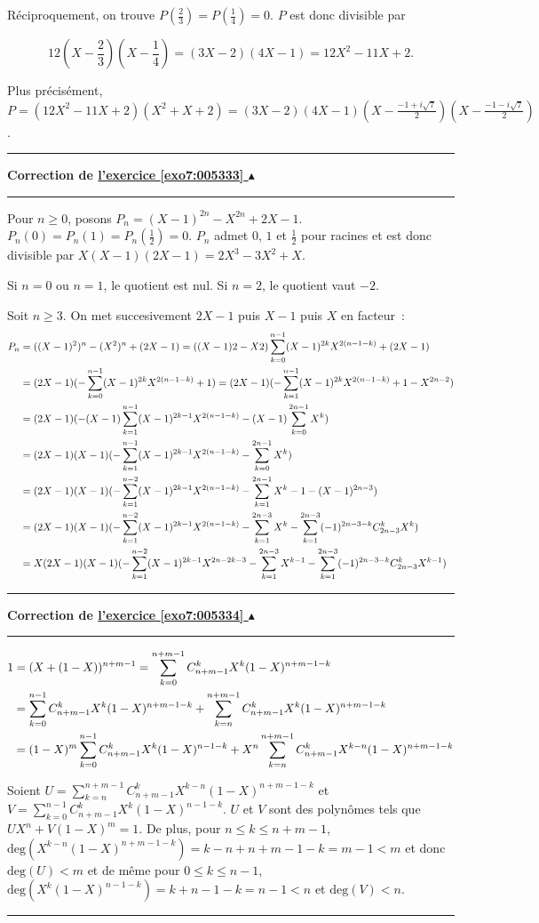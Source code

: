\documentclass[11pt,a4paper]{article}
\newcounter{exo}
\newcommand{\correction}[1]{\hypertarget{cor7:#1}{}\label{cor7:#1}{\bf Correction de \hyperlink{exo7:#1}{l'exercice \ref{exo7:#1} $\blacktriangle$}}\vspace{1mm}\hrule\vspace{1mm}}
\newcommand{\fincorrection}{\vspace{1mm}\hrule\vspace*{7mm}}
\begin{document}
Réciproquement, on trouve $P(\frac{2}{3})=P(\frac{1}{4})=0$. $P$ est donc divisible par

$$12(X-\frac{2}{3})(X-\frac{1}{4})=(3X-2)(4X-1)=12X^2-11X+2.$$

Plus précisément, $P=(12X^2-11X+2)(X^2+X+2)=(3X-2)(4X-1)(X-\frac{-1+i\sqrt{7}}{2})(X-\frac{-1-i\sqrt{7}}{2})$.
\fincorrection
\correction{005333}
Pour $n\geq0$, posons $P_n=(X-1)^{2n}-X^{2n}+2X-1$. $P_n(0)=P_n(1)=P_n(\frac{1}{2})=0$. $P_n$ admet $0$, $1$ et $\frac{1}{2}$ pour racines et est donc divisible par $X(X-1)(2X-1)=2X^3-3X^2+X$.

Si $n=0$ ou $n=1$, le quotient est nul. Si $n=2$, le quotient vaut $-2$.

Soit $n\geq 3$. On met succesivement $2X-1$ puis $X-1$ puis $X$ en facteur~:
\begin{align*}\ensuremath
P_n&=((X-1)^2)^n-(X^2)^n+(2X-1)=((X-1)2-X2)\sum_{k=0}^{n-1}(X-1)^{2k}X^{2(n-1-k)}+(2X-1)\\
 &=(2X-1)(-\sum_{k=0}^{n-1}(X-1)^{2k}X^{2(n-1-k)}+1)=(2X-1)(-\sum_{k=1}^{n-1}(X-1)^{2k}X^{2(n-1-k)}+1-X^{2n-2})\\
 &=(2X-1)(-(X-1)\sum_{k=1}^{n-1}(X-1)^{2k-1}X^{2(n-1-k)}-(X-1)\sum_{k=0}^{2n-1}X^k)\\
 &=(2X-1)(X-1)(-\sum_{k=1}^{n-1}(X-1)^{2k-1}X^{2(n-1-k)}-\sum_{k=0}^{2n-1}X^k)\\
 &=(2X-1)(X-1)(-\sum_{k=1}^{n-2}(X-1)^{2k-1}X^{2(n-1-k)}-\sum_{k=1}^{2n-1}X^k-1-(X-1)^{2n-3})\\
 &=(2X-1)(X-1)(-\sum_{k=1}^{n-2}(X-1)^{2k-1}X^{2(n-1-k)}-\sum_{k=1}^{2n-3}X^k-\sum_{k=1}^{2n-3}(-1)^{2n-3-k}C_{2n-3}^kX^k)\\
 &= X(2X-1)(X-1)(-\sum_{k=1}^{n-2}(X-1)^{2k-1}X^{2n-2k-3}-
 \sum_{k=1}^{2n-3}X^{k-1}-\sum_{k=1}^{2n-3}(-1)^{2n-3-k}C_{2n-3}^kX^{k-1})
\end{align*}

\fincorrection
\correction{005334}
\begin{align*}\ensuremath
1&=(X+(1-X))^{n+m-1}=\sum_{k=0}^{n+m-1}C_{n+m-1}^{k}X^k(1-X)^{n+m-1-k}\\
 &=\sum_{k=0}^{n-1}C_{n+m-1}^{k}X^k(1-X)^{n+m-1-k}
+\sum_{k=n}^{n+m-1}C_{n+m-1}^{k}X^k(1-X)^{n+m-1-k}\\ 
 &=(1-X)^m\sum_{k=0}^{n-1}C_{n+m-1}^{k}X^k(1-X)^{n-1-k}+X^n\sum_{k=n}^{n+m-1}C_{n+m-1}^{k}X^{k-n}(1-X)^{n+m-1-k}
\end{align*}

Soient $U=\sum_{k=n}^{n+m-1}C_{n+m-1}^{k}X^{k-n}(1-X)^{n+m-1-k}$ et $V=\sum_{k=0}^{n-1}C_{n+m-1}^{k}X^k(1-X)^{n-1-k}$. $U$ et $V$ sont des polynômes tels que $UX^n+V(1-X)^m=1$. De plus, pour $n\leq k\leq n+m-1$, $\mbox{deg}(X^{k-n}(1-X)^{n+m-1-k})=k-n+n+m-1-k=m-1<m$ et donc $\mbox{deg}(U)<m$ et de même pour $0\leq k\leq n-1$, $\mbox{deg}(X^k(1-X)^{n-1-k})=k+n-1-k=n-1<n$ et $\mbox{deg}(V)<n$.
\fincorrection
\end{document}
